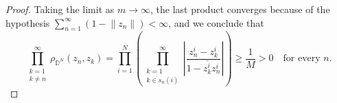 \documentclass[10pt,a4paper]{amsart}
\newcommand{\D}{\mathbb{D}}
\begin{document}
\begin{proof}
Taking the limit as $m \to \infty$, the last product converges because of the hypothesis $\sum_{n=1}^\infty(1-\lVert z_n\rVert)<\infty$, and we conclude that 
\[
\prod_{\substack{k=1\\k\neq n}}^\infty \rho_{\D^N}(z_n,z_k)=\prod_{i=1}^N\left(\prod_{\substack{k=1\\k\in s_n(i)}}^\infty \left|\frac{z_n^i-z_k^i}{1-\overline{z_k^i}z_n^i}\right| \right)\geq \frac{1}{M}>0\quad \text{for every } n.
\]
\end{proof}
\end{document}
